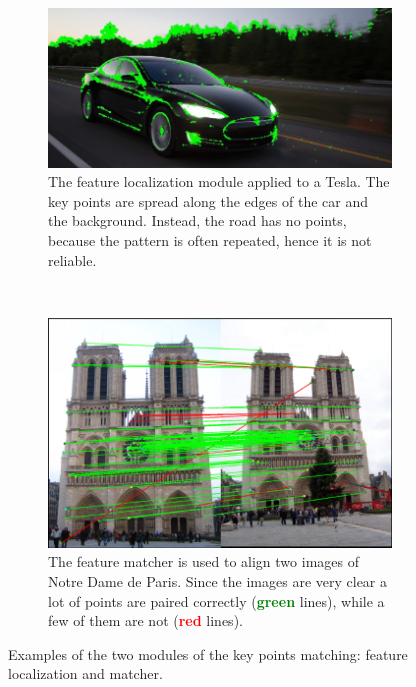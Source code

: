 \begin{figure}[!h]
	\centering
	\begin{subfigure}[!h]{0.7\textwidth}
		\includegraphics[width=\linewidth]{images/recognition/kpMatch_tesla}
		\caption{The feature localization module applied to a Tesla. The key points are spread along the edges of the car and the background. Instead, the road has no points, because the pattern is often repeated, hence it is not reliable.}
		\label{fig:kpMatch_tesla}
	\end{subfigure}
	\\
	\begin{subfigure}[!h]{0.7\textwidth}
		\includegraphics[width=\linewidth]{images/recognition/kpMatch_notreDame}
		\caption{The feature matcher is used to align two images of Notre Dame de Paris. Since the images are very clear a lot of points are paired correctly (\textbf{\textcolor{green}{green}} lines), while a few of them are not (\textbf{\textcolor{red}{red}} lines).}
		\label{fig:kpMatch_notreDame}
	\end{subfigure}
	\captionsetup{margin=0.5cm}
	\caption[Two examples of the key points matching modules.]{Examples of the two modules of the key points matching: feature localization and matcher.}
	\label{fig:kpMatch}
\end{figure}


